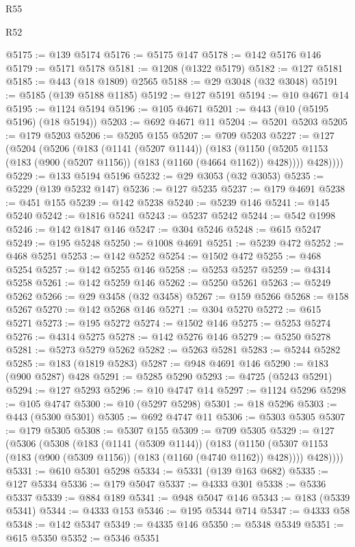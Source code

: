 \begin{lexlean}{R55}
\begin{lexlean}{R52}
\begin{coremodule}
{{{{{{{{{{{{{{{{{{{{{{{{{{{{{{{{{{{{{{{{{{{{{{{{{{{{{{{{{{{{{{{{{{{{{{{{{{{{{{{{{{{{{{{{{{{{{{{{{{{{{{{{{{{{{{{{{{{{{{{{{{{{{{{{{{{{{{{{{{{{{{{{{{{{{{{{{{{{{{{{{{{{{{{{{{{{{{{{{{{{{{{{{{{{{{{{{{{{{{@5175 := @139 @5174
@5176 := @5175 @147
@5178 := @142 @5176 @146
@5179 := @5171 @5178
@5181 := @1208 (@1322 @5179)
@5182 := @127 @5181
@5185 := @443 (@18 @1809) @2565
@5188 := @29 @3048 (@32 @3048)
@5191 := @5185 (@139 @5188 @1185)
@5192 := @127 @5191
@5194 := @10 @4671 @14
@5195 := @1124 @5194
@5196 := @105 @4671
@5201 := @443 (@10 (@5195 @5196) (@18 @5194))
@5203 := @692 @4671 @11
@5204 := @5201 @5203
@5205 := @179 @5203
@5206 := @5205 @155
@5207 := @709 @5203
@5227 := @127
    (@5204
      (@5206
        (@183
          (@1141 (@5207 @1144))
          (@183
            (@1150 (@5205 @1153 (@183 (@900 (@5207 @1156)) (@183 (@1160 (@4664 @1162)) @428))))
            @428))))
@5229 := @133 @5194 @5196
@5232 := @29 @3053 (@32 @3053)
@5235 := @5229 (@139 @5232 @147)
@5236 := @127 @5235
@5237 := @179 @4691
@5238 := @451 @155
@5239 := @142 @5238
@5240 := @5239 @146
@5241 := @145 @5240
@5242 := @1816 @5241
@5243 := @5237 @5242
@5244 := @542 @1998
@5246 := @142 @1847 @146
@5247 := @304 @5246
@5248 := @615 @5247
@5249 := @195 @5248
@5250 := @1008 @4691
@5251 := @5239 @472
@5252 := @468 @5251
@5253 := @142 @5252
@5254 := @1502 @472
@5255 := @468 @5254
@5257 := @142 @5255 @146
@5258 := @5253 @5257
@5259 := @4314 @5258
@5261 := @142 @5259 @146
@5262 := @5250 @5261
@5263 := @5249 @5262
@5266 := @29 @3458 (@32 @3458)
@5267 := @159 @5266
@5268 := @158 @5267
@5270 := @142 @5268 @146
@5271 := @304 @5270
@5272 := @615 @5271
@5273 := @195 @5272
@5274 := @1502 @146
@5275 := @5253 @5274
@5276 := @4314 @5275
@5278 := @142 @5276 @146
@5279 := @5250 @5278
@5281 := @5273 @5279 @5262
@5282 := @5263 @5281
@5283 := @5244 @5282
@5285 := @183 (@1819 @5283)
@5287 := @948 @4691 @146
@5290 := @183 (@900 @5287) @428
@5291 := @5285 @5290
@5293 := @4725 (@5243 @5291)
@5294 := @127 @5293
@5296 := @10 @4747 @14
@5297 := @1124 @5296
@5298 := @105 @4747
@5300 := @10 (@5297 @5298)
@5301 := @18 @5296
@5303 := @443 (@5300 @5301)
@5305 := @692 @4747 @11
@5306 := @5303 @5305
@5307 := @179 @5305
@5308 := @5307 @155
@5309 := @709 @5305
@5329 := @127
    (@5306
      (@5308
        (@183
          (@1141 (@5309 @1144))
          (@183
            (@1150 (@5307 @1153 (@183 (@900 (@5309 @1156)) (@183 (@1160 (@4740 @1162)) @428))))
            @428))))
@5331 := @610 @5301 @5298
@5334 := @5331 (@139 @163 @682)
@5335 := @127 @5334
@5336 := @179 @5047
@5337 := @4333 @301
@5338 := @5336 @5337
@5339 := @884 @189
@5341 := @948 @5047 @146
@5343 := @183 (@5339 @5341)
@5344 := @4333 @153
@5346 := @195 @5344 @714
@5347 := @4333 @58
@5348 := @142 @5347
@5349 := @4335 @146
@5350 := @5348 @5349
@5351 := @615 @5350
@5352 := @5346 @5351
}}}}}}}}}}}}}}}}}}}}}}}}}}}}}}}}}}}}}}}}}}}}}}}}}}}}}}}}}}}}}}}}}}}}}}}}}}}}}}}}}}}}}}}}}}}}}}}}}}}}}}}}}}}}}}}}}}}}}}}}}}}}}}}}}}}}}}}}}}}}}}}}}}}}}}}}}}}}}}}}}}}}}}}}}}}}}}}}}}}}}}}}}}}}}}}}}}}}}}
\end{coremodule}
\end{lexlean}
\end{lexlean}
